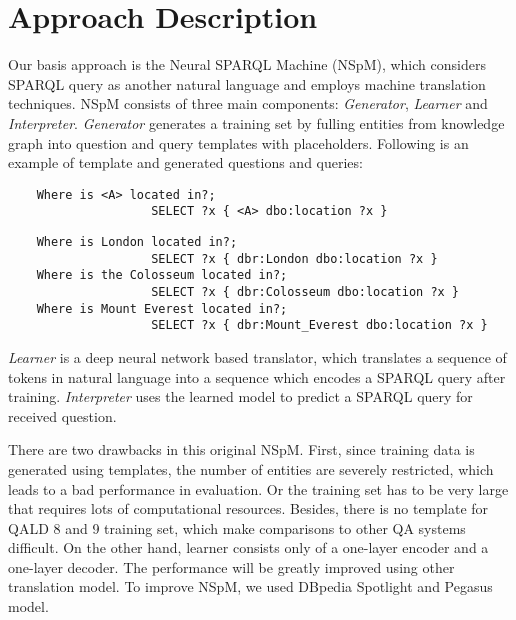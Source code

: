 
\section{Approach Description}

Our basis approach is the Neural SPARQL Machine (NSpM)\cite{soru-marx-nampi2018},
which considers SPARQL query as another natural language and employs machine translation techniques. 
NSpM consists of three main components: 
\textit{Generator}, \textit{Learner} and \textit{Interpreter}. 
\textit{Generator} generates a training set
by fulling entities from knowledge graph into question and query templates with placeholders. 
Following is an example of template and generated questions and queries:

\begin{verbatim}
    Where is <A> located in?; 
                    SELECT ?x { <A> dbo:location ?x }
\end{verbatim}

\begin{verbatim}
    Where is London located in?; 
                    SELECT ?x { dbr:London dbo:location ?x }
    Where is the Colosseum located in?; 
                    SELECT ?x { dbr:Colosseum dbo:location ?x }
    Where is Mount Everest located in?; 
                    SELECT ?x { dbr:Mount_Everest dbo:location ?x }
\end{verbatim}

\textit{Learner} is a deep neural network based translator, 
which translates a sequence of tokens in natural language
into a sequence which encodes a SPARQL query after training.
\textit{Interpreter} uses the learned model to predict a SPARQL query for received question.

There are two drawbacks in this original NSpM.
First, since training data is generated using templates, 
the number of entities are severely restricted,
which leads to a bad performance in evaluation.
Or the training set has to be very large
that requires lots of computational resources. 
Besides, there is no template for QALD 8 and 9 training set,
which make comparisons to other QA systems difficult. 
On the other hand, 
learner consists only of a one-layer encoder and a one-layer decoder.
The performance will be greatly improved using other translation model.
To improve NSpM, we used DBpedia Spotlight and Pegasus model. 

